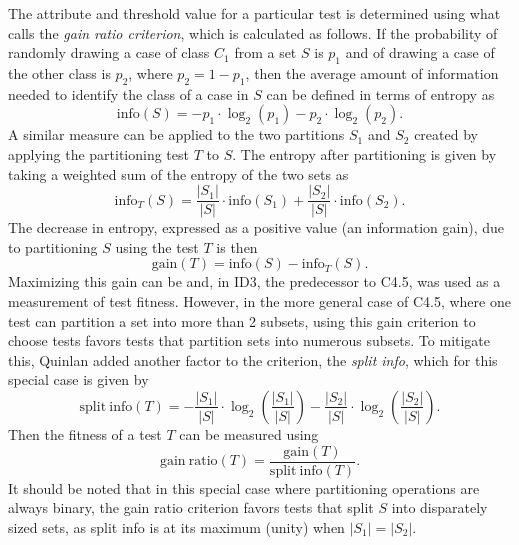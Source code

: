 \documentclass[main.tex]{subfiles}
\begin{document}
The attribute and threshold value for a particular test is determined using what \citet{quinlan:1993} calls the \textit{gain ratio criterion}, which is calculated as follows. If the probability of randomly drawing a case of class $C_1$ from a set $S$ is $p_1$ and of drawing a case of the other class is $p_2$, where $p_2 = 1-p_1$, then the average amount of information needed to identify the class of a case in $S$ can be defined in terms of entropy as
\begin{equation}
\mathrm{info}(S)=-p_1 \cdot \log_2(p_1) - p_2 \cdot \log_2(p_2).
\end{equation}
A similar measure can be applied to the two partitions $S_1$ and $S_2$ created by applying the partitioning test $T$ to $S$. The entropy after partitioning is given by taking a weighted sum of the entropy of the two sets as
\begin{equation}
\mathrm{info}_T(S)=\frac{|S_1|}{|S|} \cdot \mathrm{info}(S_1) + \frac{|S_2|}{|S|} \cdot \mathrm{info}(S_2).
\end{equation}
The decrease in entropy, expressed as a positive value (an information gain), due to partitioning $S$ using the test $T$ is then
\begin{equation}
\mathrm{gain}(T)=\mathrm{info}(S)-\mathrm{info}_T(S).
\end{equation}
Maximizing this gain can be and, in ID3, the predecessor to C4.5, was used as a measurement of test fitness. However, in the more general case of C4.5, where one test can partition a set into more than 2 subsets, using this gain criterion to choose tests favors tests that partition sets into numerous subsets. To mitigate this, Quinlan added another factor to the criterion, the \textit{split info}, which for this special case is given by
\begin{equation}
\mathrm{split\ info}(T)= -\frac{|S_1|}{|S|} \cdot \log_2 \left( \frac{|S_1|}{|S|} \right) - \frac{|S_2|}{|S|} \cdot \log_2  \left( \frac{|S_2|}{|S|}  \right).
\end{equation}
Then the fitness of a test $T$ can be measured using
\begin{equation}
\mathrm{gain\ ratio}(T) = \frac{\mathrm{gain}(T)}{\mathrm{split\ info}(T)}.
\end{equation}
It should be noted that in this special case where partitioning operations are always binary, the gain ratio criterion favors tests that split $S$ into disparately sized sets, as split info is at its maximum (unity) when $|S_1|=|S_2|$.
\end{document}
